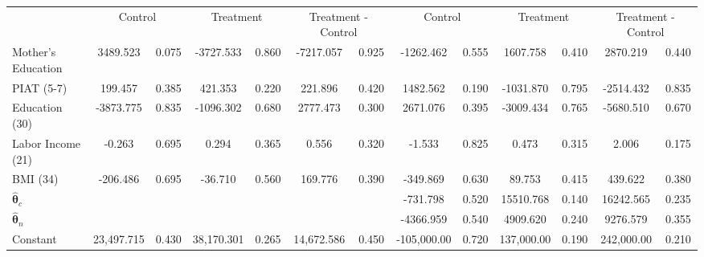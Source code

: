 \begin{tabular}{lcccccccccccc} \toprule
&\multicolumn{2}{c}{Control} & \multicolumn{2}{c}{Treatment} & \multicolumn{2}{c}{Treatment - Control} & \multicolumn{2}{c}{Control} & \multicolumn{2}{c}{Treatment} & \multicolumn{2}{c}{Treatment - Control} \\
Mother's Education &  3489.523 &     0.075 & -3727.533 &     0.860 & -7217.057 &     0.925 & -1262.462 &     0.555 &  1607.758 &     0.410 &  2870.219 &     0.440 \\  
PIAT (5-7) &   199.457 &     0.385 &   421.353 &     0.220 &   221.896 &     0.420 &  1482.562 &     0.190 & -1031.870 &     0.795 & -2514.432 &     0.835 \\  
Education (30) & -3873.775 &     0.835 & -1096.302 &     0.680 &  2777.473 &     0.300 &  2671.076 &     0.395 & -3009.434 &     0.765 & -5680.510 &     0.670 \\  
Labor Income (21) &    -0.263 &     0.695 &     0.294 &     0.365 &     0.556 &     0.320 &    -1.533 &     0.825 &     0.473 &     0.315 &     2.006 &     0.175 \\  
BMI (34) &  -206.486 &     0.695 &   -36.710 &     0.560 &   169.776 &     0.390 &  -349.869 &     0.630 &    89.753 &     0.415 &   439.622 &     0.380 \\  
$\hat{\bm{\theta}}_c$ &         &         &         &         &         &         &  -731.798 &     0.520 & 15510.768 &     0.140 & 16242.565 &     0.235 \\  
$\hat{\bm{\theta}}_n$ &         &         &         &         &         &         & -4366.959 &     0.540 &  4909.620 &     0.240 &  9276.579 &     0.355 \\  
Constant & 23,497.715 &     0.430 & 38,170.301 &     0.265 & 14,672.586 &     0.450 & -105,000.00 &     0.720 &  137,000.00 &     0.190 &  242,000.00 &     0.210 \\  
\bottomrule \end{tabular}
